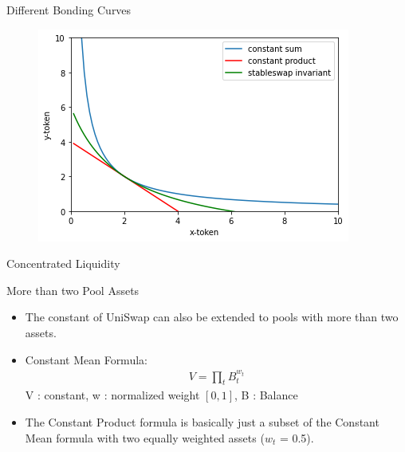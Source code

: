 \documentclass[]{beamer}
\begin{document}
\begin{frame}{Different Bonding Curves}
\begin{figure}
	\includegraphics[scale=0.6]{../assets/images/bonding-curves.png}
\end{figure}

%    
%    
%  
%
%  
%
%
\end{frame}


\begin{frame}{Concentrated Liquidity}

\end{frame}


\begin{frame}{More than two Pool Assets}
\begin{itemize}
	\item The constant of UniSwap can also be extended to pools with more than two assets.
	\item Constant Mean Formula:
		\begin{align*}
			V = \prod_t B^{w_{t}}_{t}
		\end{align*}
	V : constant, w : normalized weight $[0,1]$, B : Balance
	\item The Constant Product formula is basically just a subset of the Constant Mean formula with two equally weighted assets ($w_t$ = 0.5).
\end{itemize}

\end{frame}
\end{document}
